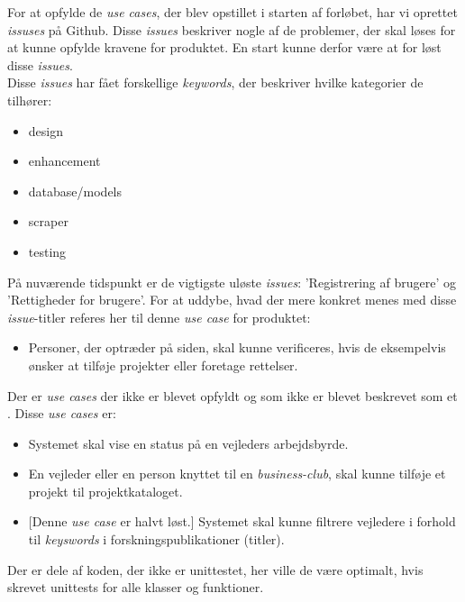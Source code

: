 \documentclass[11pt]{article}
\begin{document}
For at opfylde de \textit{use cases}, der blev opstillet i starten af forløbet, har vi oprettet \textit{issuses} på Github. Disse \textit{issues} beskriver nogle af de problemer, der skal løses for at kunne opfylde kravene for produktet. En start kunne derfor være at for løst disse \textit{issues}. \\
Disse \textit{issues} har fået forskellige \textit{keywords}, der beskriver hvilke kategorier de tilhører:
\begin{itemize}
	\item{design}
	\item{enhancement}
	\item{database/models}
	\item{scraper}
	\item{testing}
\end{itemize}
På nuværende tidspunkt er de vigtigste uløste \textit{issues}: 'Registrering af brugere' og 'Rettigheder for brugere'. For at uddybe, hvad der mere konkret menes med disse \textit{issue}-titler referes her til denne \textit{use case} for produktet:
\begin{itemize}
 \item[]{Personer, der optræder på siden, skal kunne verificeres, hvis de eksempelvis ønsker at tilføje projekter eller foretage rettelser.}
\end{itemize}
Der er \textit{use cases} der ikke er blevet opfyldt og som ikke er blevet beskrevet som et . Disse \textit{use cases} er:
\begin{itemize}
\item{Systemet skal vise en status på en vejleders arbejdsbyrde.}
\item{En vejleder eller en person knyttet til en \textit{business-club}, skal kunne tilføje et projekt til projektkataloget.}
\item{[Denne \textit{use case} er halvt løst.] Systemet skal kunne filtrere vejledere i forhold til \textit{keyswords} i forskningspublikationer (titler).}
\end{itemize}
Der er dele af koden, der ikke er unittestet, her ville de være optimalt, hvis skrevet unittests for alle klasser og funktioner.
\end{document}
